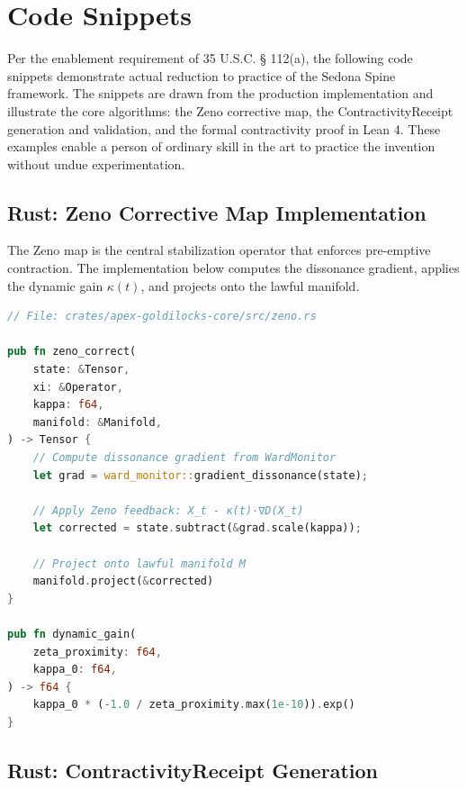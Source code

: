 \documentclass[12pt]{article}
\theoremstyle{plain}
\theoremstyle{definition}
\theoremstyle{remark}
\begin{document}
\section{Code Snippets}

\noindent
Per the enablement requirement of 35 U.S.C. § 112(a), the following code snippets demonstrate actual reduction to practice of the Sedona Spine framework. The snippets are drawn from the production implementation and illustrate the core algorithms: the Zeno corrective map, the ContractivityReceipt generation and validation, and the formal contractivity proof in Lean 4. These examples enable a person of ordinary skill in the art to practice the invention without undue experimentation.

\subsection{Rust: Zeno Corrective Map Implementation}

The Zeno map is the central stabilization operator that enforces pre-emptive contraction. The implementation below computes the dissonance gradient, applies the dynamic gain $\kappa(t)$, and projects onto the lawful manifold.

\begin{lstlisting}[language=Rust, caption=Zeno Corrective Map (zeno.rs), label=lst:zeno]
// File: crates/apex-goldilocks-core/src/zeno.rs

pub fn zeno_correct(
    state: &Tensor,
    xi: &Operator,
    kappa: f64,
    manifold: &Manifold,
) -> Tensor {
    // Compute dissonance gradient from WardMonitor
    let grad = ward_monitor::gradient_dissonance(state);
    
    // Apply Zeno feedback: X_t - κ(t)·∇D(X_t)
    let corrected = state.subtract(&grad.scale(kappa));
    
    // Project onto lawful manifold M
    manifold.project(&corrected)
}

pub fn dynamic_gain(
    zeta_proximity: f64,
    kappa_0: f64,
) -> f64 {
    kappa_0 * (-1.0 / zeta_proximity.max(1e-10)).exp()
}
\end{lstlisting}

\subsection{Rust: ContractivityReceipt Generation}
\end{document}

